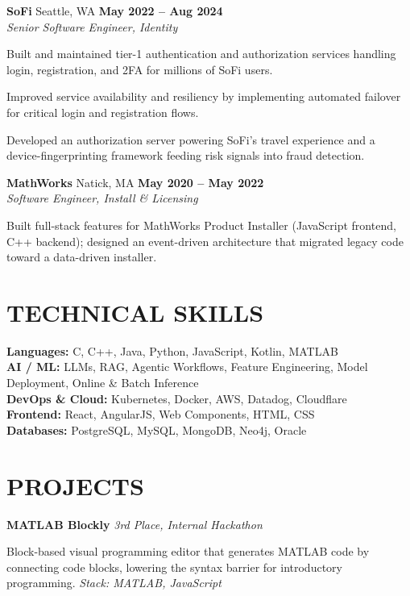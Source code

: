 \documentclass[10pt, letterpaper]{article}
\newcommand{\employer}[4]{%
  \textbf{#1} \;\textbullet\; #2 \hfill \textbf{#3} \\[0pt]
  {\itshape #4}%
}
\newcommand{\project}[2]{%
  \textbf{#1} \hfill {\itshape #2}%
}
\begin{document}
\vspace{2pt}
\employer{SoFi}{Seattle, WA}{May 2022 -- Aug 2024}{Senior Software Engineer, Identity}
\begin{cvitems}
  \item Built and maintained tier-1 authentication and authorization services handling login, registration, and 2FA for millions of SoFi users.
  \item Improved service availability and resiliency by implementing automated failover for critical login and registration flows.
  \item Developed an authorization server powering SoFi's travel experience and a device-fingerprinting framework feeding risk signals into fraud detection.
\end{cvitems}

\vspace{2pt}
\employer{MathWorks}{Natick, MA}{May 2020 -- May 2022}{Software Engineer, Install \& Licensing}
\begin{cvitems}
  \item Built full-stack features for MathWorks Product Installer (JavaScript frontend, C++ backend); designed an event-driven architecture that migrated legacy code toward a data-driven installer.
\end{cvitems}

\section{TECHNICAL SKILLS}

\textbf{Languages:} C, C++, Java, Python, JavaScript, Kotlin, MATLAB \\[2pt]
\textbf{AI / ML:} LLMs, RAG, Agentic Workflows, Feature Engineering, Model Deployment, Online \& Batch Inference \\[2pt]
\textbf{DevOps \& Cloud:} Kubernetes, Docker, AWS, Datadog, Cloudflare \\[2pt]
\textbf{Frontend:} React, AngularJS, Web Components, HTML, CSS \\[2pt]
\textbf{Databases:} PostgreSQL, MySQL, MongoDB, Neo4j, Oracle

\section{PROJECTS}

\project{MATLAB Blockly}{3rd Place, Internal Hackathon}
\begin{cvitems}
  \item Block-based visual programming editor that generates MATLAB code by connecting code blocks, lowering the syntax barrier for introductory programming. \textit{Stack: MATLAB, JavaScript}
\end{cvitems}
\end{document}
